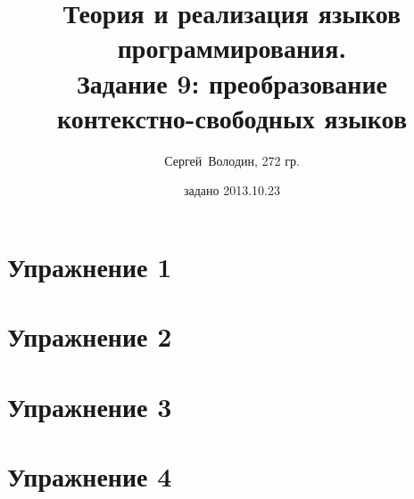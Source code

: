 \documentclass[a4paper]{article}
\title{Теория и реализация языков программирования.\\Задание 9: преобразование контекстно-свободных языков}
\date{задано 2013.10.23}
\author{Сергей~Володин, 272 гр.}
\begin{document}
\maketitle
\section*{Упражнение 1}
\section*{Упражнение 2}
\section*{Упражнение 3}
\section*{Упражнение 4}
\end{document}
